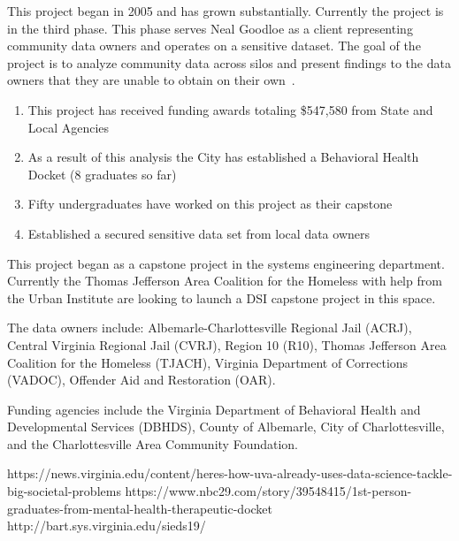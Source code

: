 This project began in 2005 and has grown substantially. Currently the project is in the third phase. This phase serves Neal Goodloe as a client representing community data owners and operates on a sensitive dataset. The goal of the project is to analyze community data across silos and present findings to the data owners that they are unable to obtain on their own~\cite{ref:uva}.

\begin{enumerate}
\item This project has received funding awards totaling \$547,580 from State and Local Agencies
\item As a result of this analysis the City has established a Behavioral Health Docket (8 graduates so far) \cite{ref:docket}
\item Fifty undergraduates have worked on this project as their capstone~\cite{ref:sieds}
\item Established a secured sensitive data set from local data owners
\end{enumerate}

This project began as a capstone project in the systems engineering department. Currently the Thomas Jefferson Area Coalition for the Homeless with help from the Urban Institute are looking to launch a DSI capstone project in this space.

The data owners include: Albemarle-Charlottesville Regional Jail (ACRJ), Central Virginia Regional Jail (CVRJ), Region 10 (R10), Thomas Jefferson Area Coalition for the Homeless (TJACH), Virginia Department of Corrections (VADOC), Offender Aid and Restoration (OAR).

Funding agencies include the Virginia Department of Behavioral Health and Developmental Services (DBHDS), County of Albemarle, City of Charlottesville, and the Charlottesville Area Community Foundation.

\pagebreak

\begin{thebibliography}{99}
 https://news.virginia.edu/content/heres-how-uva-already-uses-data-science-tackle-big-societal-problems
 https://www.nbc29.com/story/39548415/1st-person-graduates-from-mental-health-therapeutic-docket
 http://bart.sys.virginia.edu/sieds19/
\end{thebibliography}
